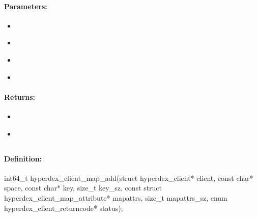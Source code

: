 \paragraph{Parameters:}
\begin{itemize}[noitemsep]
\item {}\\

\item {}\\

\item {}\\

\item {}\\

\end{itemize}

\paragraph{Returns:}
\begin{itemize}[noitemsep]
\item {}\\

\item {}\\

\end{itemize}

\pagebreak
\subsection{}
\label{api:c:map_add}


\paragraph{Definition:}
\begin{ccode}
int64_t hyperdex_client_map_add(struct hyperdex_client* client,
        const char* space,
        const char* key, size_t key_sz,
        const struct hyperdex_client_map_attribute* mapattrs, size_t mapattrs_sz,
        enum hyperdex_client_returncode* status);
\end{ccode}

